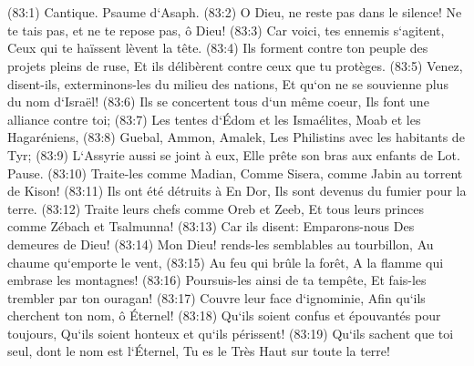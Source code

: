 \chapter{}

\verse (83:1) Cantique. Psaume d`Asaph. (83:2) O Dieu, ne reste pas dans le silence! Ne te tais pas, et ne te repose pas, ô Dieu! 
\verse (83:3) Car voici, tes ennemis s`agitent, Ceux qui te haïssent lèvent la tête. 
\verse (83:4) Ils forment contre ton peuple des projets pleins de ruse, Et ils délibèrent contre ceux que tu protèges. 
\verse (83:5) Venez, disent-ils, exterminons-les du milieu des nations, Et qu`on ne se souvienne plus du nom d`Israël! 
\verse (83:6) Ils se concertent tous d`un même coeur, Ils font une alliance contre toi; 
\verse (83:7) Les tentes d`Édom et les Ismaélites, Moab et les Hagaréniens, 
\verse (83:8) Guebal, Ammon, Amalek, Les Philistins avec les habitants de Tyr; 
\verse (83:9) L`Assyrie aussi se joint à eux, Elle prête son bras aux enfants de Lot. Pause. 
\verse (83:10) Traite-les comme Madian, Comme Sisera, comme Jabin au torrent de Kison! 
\verse (83:11) Ils ont été détruits à En Dor, Ils sont devenus du fumier pour la terre. 
\verse (83:12) Traite leurs chefs comme Oreb et Zeeb, Et tous leurs princes comme Zébach et Tsalmunna! 
\verse (83:13) Car ils disent: Emparons-nous Des demeures de Dieu! 
\verse (83:14) Mon Dieu! rends-les semblables au tourbillon, Au chaume qu`emporte le vent, 
\verse (83:15) Au feu qui brûle la forêt, A la flamme qui embrase les montagnes! 
\verse (83:16) Poursuis-les ainsi de ta tempête, Et fais-les trembler par ton ouragan! 
\verse (83:17) Couvre leur face d`ignominie, Afin qu`ils cherchent ton nom, ô Éternel! 
\verse (83:18) Qu`ils soient confus et épouvantés pour toujours, Qu`ils soient honteux et qu`ils périssent! 
\verse (83:19) Qu`ils sachent que toi seul, dont le nom est l`Éternel, Tu es le Très Haut sur toute la terre! 

\chapter{}

